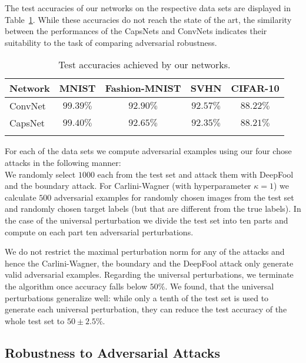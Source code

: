 The test accuracies of our networks on the respective data sets are displayed in Table~\ref{tab:accuracies}.
While these accuracies do not reach the state of the art, the similarity between the performances of the CapsNets and ConvNets indicates their suitability to the task of comparing adversarial robustness.

\begin{table}[h]
	
	\centering%
	\begin{tabular}{lcccc}
		\toprule
		Network       & MNIST & Fashion-MNIST & SVHN & CIFAR-10  \\
		\midrule
		ConvNet           & $99.39\%$ & $92.90\%$ & $92.57\%$ & $88.22\%$ \\
		CapsNet           & $99.40\%$ & $92.65\%$ & $92.35\%$ & $88.21\%$ \\
		\bottomrule\\
	\end{tabular}%
	\caption{Test accuracies achieved by our networks.}
	\label{tab:accuracies}
\end{table}

For each of the data sets we compute adversarial examples using our four chose attacks in the following manner: \\
We randomly select $1000$ each from the test set and attack them with DeepFool and the boundary attack.
For Carlini-Wagner (with hyperparameter $\kappa=1$) we calculate $500$ adversarial examples for randomly chosen images from the test set and randomly chosen target labels (but that are different from the true labels). In the case of the universal perturbation we divide the test set into ten parts and compute on each part ten adversarial perturbations.

We do not restrict the maximal perturbation norm for any of the attacks and hence the Carlini-Wagner, the boundary and the DeepFool attack only generate valid adversarial examples.
Regarding the universal perturbations, we terminate the algorithm once accuracy falls below $50\%$.
We found, that the universal perturbations generalize well: while only a tenth of the test set is used to generate each universal perturbation, they can reduce the test accuracy of the whole test set to $50\pm2.5\%$.



\subsection{Robustness to Adversarial Attacks}

